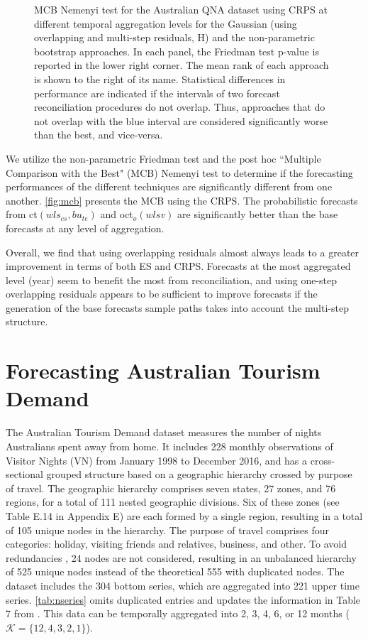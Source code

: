 \documentclass[a4paper,11pt]{article}
\theoremstyle{definition}
\begin{document}
\begin{figure}[p]
	\caption{MCB Nemenyi test for the Australian QNA dataset using CRPS at different temporal aggregation levels for the Gaussian (using overlapping and multi-step residuals, H) and the non-parametric bootstrap approaches. In each panel, the Friedman test p-value is reported in the lower right corner. The mean rank of each approach is shown to the right of its name. Statistical differences in performance are indicated if the intervals of two forecast reconciliation procedures do not overlap. Thus, approaches that do not overlap with the blue interval are considered significantly worse than the best, and vice-versa.}
	\label{fig:mcb}
\end{figure}

We utilize the non-parametric Friedman test and the post hoc “Multiple Comparison with the Best" (MCB) Nemenyi test \citep{koning2005, kourentzes2019, makridakis2022} to determine if the forecasting performances of the different techniques are significantly different from one another.
\autoref{fig:mcb} presents the MCB using the CRPS. The probabilistic forecasts from ct$(wls_{cs},bu_{te})$ and oct$_o(wlsv)$ are significantly better than the base forecasts at any level of aggregation.

Overall, we find that using overlapping residuals almost always leads to a greater improvement in terms of both ES and CRPS. %
Forecasts at the most aggregated level (year) seem to benefit the most from reconciliation, and using one-step overlapping residuals appears to be sufficient to improve forecasts if the generation of the base forecasts sample paths takes into account the multi-step structure.



\section{Forecasting Australian Tourism Demand}\label{sec:vn525}

The Australian Tourism Demand dataset \citep{wickramasuriya2019} measures the number of nights Australians spent away from home. It includes 228 monthly observations of Visitor Nights (VN) from January 1998 to December 2016, and has a cross-sectional grouped structure based on a geographic hierarchy crossed by purpose of travel. The geographic hierarchy comprises seven states, 27 zones, and 76 regions, for a total of 111 nested geographic divisions. Six of these zones (see Table E.14 in Appendix E) are each formed by a single region, resulting in a total of 105 unique nodes in the hierarchy. The purpose of travel comprises four categories: holiday, visiting friends and relatives, business, and other.
To avoid redundancies \citep{difonzo2022a}, 24 nodes are not considered, resulting in an unbalanced hierarchy of 525 unique nodes instead of the theoretical 555 with duplicated nodes.
The dataset includes the 304 bottom series, which are aggregated into 221 upper time series. \autoref{tab:nseries} omits duplicated entries and updates the information in Table 7 from \cite{wickramasuriya2019}. This data can be temporally aggregated into 2, 3, 4, 6, or 12 months ($\mathcal{K} = \{12,4,3,2,1\}$).
\end{document}
